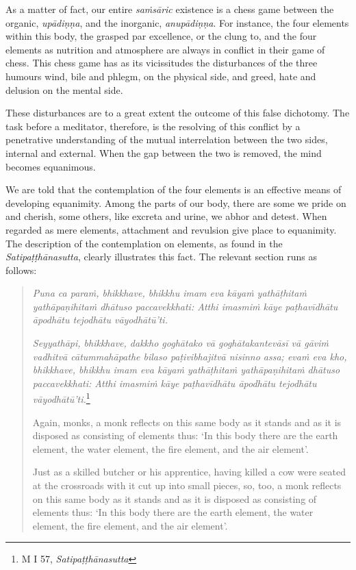 As a matter of fact, our entire \emph{saṁsāric} existence is a chess game between the organic, \emph{upādiṇṇa}, and the inorganic, \emph{anupādiṇṇa}. For instance, the four elements within this body, the grasped par excellence, or the clung to, and the four elements as nutrition and atmosphere are always in conflict in their game of chess. This chess game has as its vicissitudes the disturbances of the three humours wind, bile and phlegm, on the physical side, and greed, hate and delusion on the mental side.

These disturbances are to a great extent the outcome of this false dichotomy. The task before a meditator, therefore, is the resolving of this conflict by a penetrative understanding of the mutual interrelation between the two sides, internal and external. When the gap between the two is removed, the mind becomes equanimous.

We are told that the contemplation of the four elements is an effective means of developing equanimity. Among the parts of our body, there are some we pride on and cherish, some others, like excreta and urine, we abhor and detest. When regarded as mere elements, attachment and revulsion give place to equanimity. The description of the contemplation on elements, as found in the \emph{Satipaṭṭhānasutta}, clearly illustrates this fact. The relevant section runs as follows:

\begin{quote}
\emph{Puna ca paraṁ, bhikkhave, bhikkhu imam eva kāyaṁ yathāṭhitaṁ yathāpaṇihitaṁ dhātuso paccavekkhati: Atthi imasmiṁ kāye paṭhavīdhātu āpodhātu tejodhātu vāyodhātū'ti.}

\emph{Seyyathāpi, bhikkhave, dakkho goghātako vā goghātakantevāsī vā gāviṁ vadhitvā cātummahāpathe bilaso paṭivibhajitvā nisinno assa; evaṁ eva kho, bhikkhave, bhikkhu imam eva kāyaṁ yathāṭhitaṁ yathāpaṇihitaṁ dhātuso paccavekkhati: Atthi imasmiṁ kāye paṭhavīdhātu āpodhātu tejodhātu vāyodhātū'ti.}\footnote{M I 57, \emph{Satipaṭṭhānasutta}}

Again, monks, a monk reflects on this same body as it stands and as it is disposed as consisting of elements thus: `In this body there are the earth element, the water element, the fire element, and the air element'.

Just as a skilled butcher or his apprentice, having killed a cow were seated at the crossroads with it cut up into small pieces, so, too, a monk reflects on this same body as it stands and as it is disposed as consisting of elements thus: `In this body there are the earth element, the water element, the fire element, and the air element'.
\end{quote}

